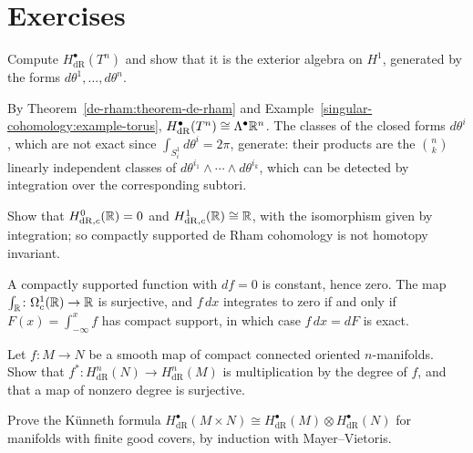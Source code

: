 \section{Exercises}\label{de-rham:section-exercises}

\begin{exercise}\label{de-rham:exercise-torus}
Compute $H^\bullet_{\mathrm{dR}}(T^n)$ and show that it is the exterior algebra on $H^1$, generated by the forms $d\theta^1, \ldots, d\theta^n$.
\end{exercise}

\begin{solution}
By Theorem~\ref{de-rham:theorem-de-rham} and Example~\ref{singular-cohomology:example-torus}, $H^\bullet_{\mathrm{dR}}(T^n) \cong \Lambda^\bullet\mathbb{R}^n$. The classes of the closed forms $d\theta^i$, which are
not exact since $\int_{S^1_i}d\theta^i = 2\pi$, generate: their products are the $\binom{n}{k}$ linearly independent classes of $d\theta^{i_1} \wedge \cdots \wedge d\theta^{i_k}$, which can be detected by
integration over the corresponding subtori.
\end{solution}

\begin{exercise}\label{de-rham:exercise-compactly-supported-line}
Show that $H^0_{\mathrm{dR},c}(\mathbb{R}) = 0$ and $H^1_{\mathrm{dR},c}(\mathbb{R}) \cong \mathbb{R}$, with the isomorphism given by integration; so compactly supported de Rham cohomology is not homotopy invariant.
\end{exercise}

\begin{solution}
A compactly supported function with $df = 0$ is constant, hence zero. The map $\int_{\mathbb{R}} \colon \Omega^1_c(\mathbb{R}) \to \mathbb{R}$ is surjective, and $f\,dx$ integrates to zero if and only if $F(x) = \int_{-\infty}^xf$ has
compact support, in which case $f\,dx = dF$ is exact.
\end{solution}

\begin{exercise}\label{de-rham:exercise-degree-de-rham}
Let $f \colon M \to N$ be a smooth map of compact connected oriented $n$-manifolds. Show that $f^* \colon H^n_{\mathrm{dR}}(N) \to H^n_{\mathrm{dR}}(M)$ is multiplication by the degree of $f$, and that a map of
nonzero degree is surjective.
\end{exercise}

\begin{exercise}\label{de-rham:exercise-kunneth-de-rham}
Prove the K\"unneth formula $H^\bullet_{\mathrm{dR}}(M \times N) \cong H^\bullet_{\mathrm{dR}}(M) \otimes H^\bullet_{\mathrm{dR}}(N)$ for manifolds with finite good covers, by induction with Mayer--Vietoris.
\end{exercise}

